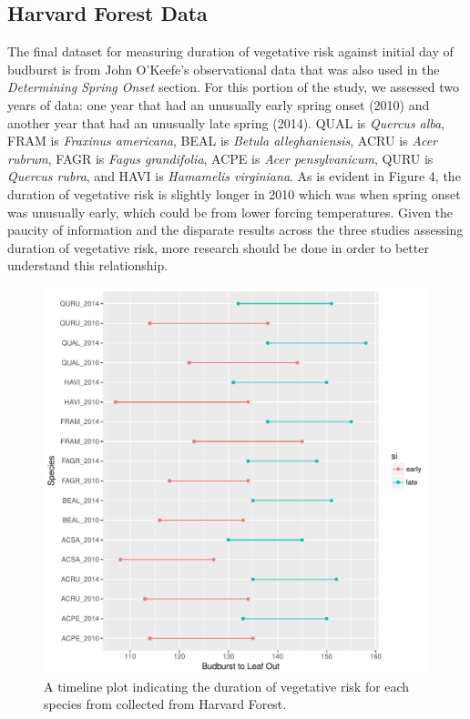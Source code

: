 \documentclass{article}\usepackage[]{graphicx}\usepackage[]{color}
\makeatletter
\def\maxwidth{ %
  \ifdim\Gin@nat@width>\linewidth
    \linewidth
  \else
    \Gin@nat@width
  \fi
}
\makeatother
\begin{document}
\subsection*{Harvard Forest Data}
The final dataset for measuring duration of vegetative risk against initial day of budburst is from John O'Keefe's observational data that was also used in the \textit{Determining Spring Onset} section. For this portion of the study, we assessed two years of data: one year that had an unusually early spring onset (2010) and another year that had an unusually late spring (2014). QUAL is \textit{Quercus alba}, FRAM is \textit{Fraxinus americana}, BEAL is \textit{Betula alleghaniensis}, ACRU is \textit{Acer rubrum}, FAGR is \textit{Fagus grandifolia}, ACPE is \textit{Acer pensylvanicum}, QURU is \textit{Quercus rubra}, and HAVI is \textit{Hamamelis virginiana}. As is evident in Figure 4, the duration of vegetative risk is slightly longer in 2010 which was when spring onset was unusually early, which could be from lower forcing temperatures. Given the paucity of information and the disparate results across the three studies assessing duration of vegetative risk, more research should be done in order to better understand this relationship. 


\begin{figure}[H]
\includegraphics[width=\maxwidth]{figure/forest-1} \caption[A timeline plot indicating the duration of vegetative risk for each species from collected from Harvard Forest]{A timeline plot indicating the duration of vegetative risk for each species from collected from Harvard Forest.}\label{fig:forest}
\end{figure}
\end{document}
